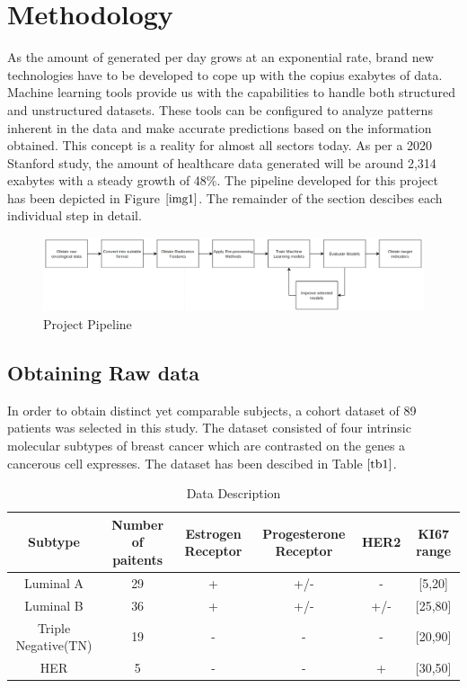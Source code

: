 \documentclass[10pt,journal,compsoc]{IEEEtran}
\begin{document}
\section{Methodology}

As the amount of generated per day grows at an exponential rate, brand new technologies have to be developed to cope up with the copius exabytes of data. Machine learning tools provide us with the capabilities to handle both structured and unstructured datasets. These tools can be configured to analyze patterns inherent in the data and make accurate predictions based on the information obtained. This concept is a reality for almost all sectors today. As per a 2020 Stanford study, the amount of healthcare data generated will be around 2,314 exabytes with a steady growth of 48\%. The pipeline  developed for this project has been depicted in Figure $\ref{img1}$. The remainder of the section descibes each individual step in detail.

\begin{figure}[!b]
\centering
\includegraphics[width=6in]{img1.png}
\caption{Project Pipeline}
\label{img1}
\end{figure}

\subsection{Obtaining Raw data}

In order to obtain distinct yet comparable subjects, a cohort dataset of 89 patients was selected in this study. The dataset consisted of four intrinsic molecular subtypes of breast cancer which are contrasted on the genes a cancerous cell expresses. The dataset has been descibed in Table $\ref{tb1}$.

\begin{table}[!b]
\centering
\caption{Data Description}
\label{tb1}
\begin{tabular}{| c | c | c | c | c | c |}
\hline
Subtype & Number of paitents & Estrogen Receptor & Progesterone Receptor & HER2 & KI67 range\\
\hline
Luminal A & 29 & + & +/- & - & [5,20] \\
Luminal B & 36 & + & +/- & +/- & [25,80] \\
Triple Negative(TN) & 19 & - & - & - & [20,90] \\
HER & 5 & - & - & + & [30,50]\\
\hline
\end{tabular}
\end{table}
\end{document}
